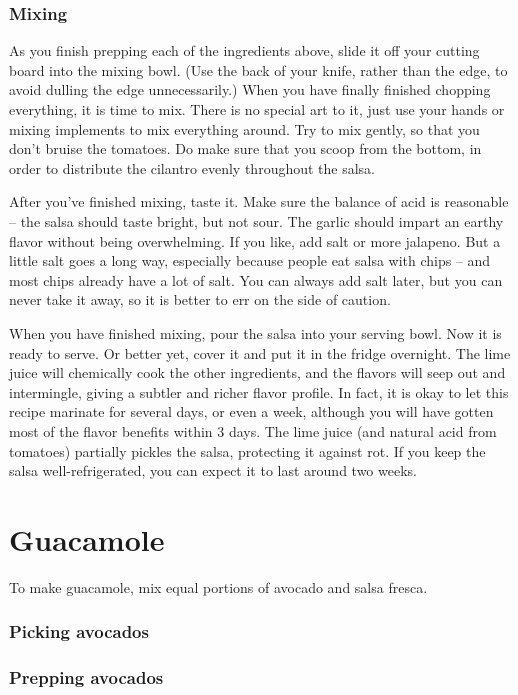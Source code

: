 \subsubsection{Mixing}

As you finish prepping each of the ingredients above, slide it off your cutting board into the mixing bowl. (Use the back of your knife, rather than the edge, to avoid dulling the edge unnecessarily.) When you have finally finished chopping everything, it is time to mix. There is no special art to it, just use your hands or mixing implements to mix everything around. Try to mix gently, so that you don't bruise the tomatoes. Do make sure that you scoop from the bottom, in order to distribute the cilantro evenly throughout the salsa.

After you've finished mixing, taste it. Make sure the balance of acid is reasonable -- the salsa should taste bright, but not sour. The garlic should impart an earthy flavor without being overwhelming. If you like, add salt or more jalapeno. But a little salt goes a long way, especially because people eat salsa with chips -- and most chips already have a lot of salt. You can always add salt later, but you can never take it away, so it is better to err on the side of caution.

When you have finished mixing, pour the salsa into your serving bowl. Now it is ready to serve. Or better yet, cover it and put it in the fridge overnight. The lime juice will chemically cook the other ingredients, and the flavors will seep out and intermingle, giving a subtler and richer flavor profile. In fact, it is okay to let this recipe marinate for several days, or even a week, although you will have gotten most of the flavor benefits within 3 days. The lime juice (and natural acid from tomatoes) partially pickles the salsa, protecting it against rot. If you keep the salsa well-refrigerated, you can expect it to last around two weeks.

\newpage \section{Guacamole}

To make guacamole, mix equal portions of avocado and salsa fresca. 

\subsubsection{Picking avocados}

\subsubsection{Prepping avocados}

